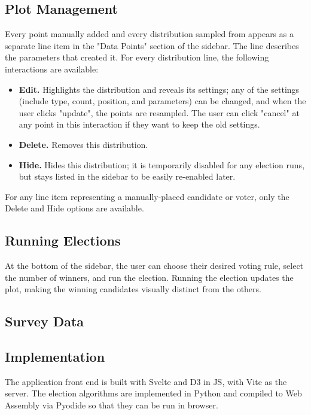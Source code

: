 \subsection{Plot Management}%
\label{sub:Plot Management}
Every point manually added and every distribution sampled from
appears as a separate line item in the "Data Points" section of the sidebar.
The line describes the parameters that created it.
For every distribution line, the following interactions are available:
\begin{itemize}
  \item \textbf{Edit.}
    Highlights the distribution and reveals its settings;
    any of the settings (include type, count, position, and parameters)
    can be changed, and when the user clicks "update",
    the points are resampled.
    The user can click "cancel" at any point in this interaction
    if they want to keep the old settings.
  \item \textbf{Delete.}
    Removes this distribution.
  \item \textbf{Hide.}
    Hides this distribution; it is temporarily disabled
    for any election runs, but stays listed in the sidebar
    to be easily re-enabled later.
\end{itemize}
For any line item representing a manually-placed candidate or voter,
only the Delete and Hide options are available.

\subsection{Running Elections}%
\label{sub:Running Elections}
At the bottom of the sidebar, the user can choose their desired voting rule,
select the number of winners, and run the election.
Running the election updates the plot,
making the winning candidates visually distinct from the others.


\subsection{Survey Data}%
\label{sub:Survey Data}

\subsection{Implementation}%
\label{sub:Implementation}
The application front end is built with Svelte and D3 in JS,
with Vite as the server.
The election algorithms are implemented in Python and
compiled to Web Assembly via Pyodide so that they can be run in browser.

